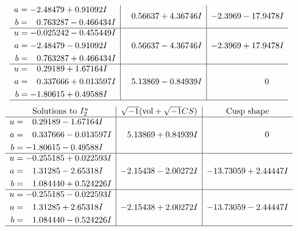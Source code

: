 \documentclass[1p]{elsarticle_modified}
\theoremstyle{definition}
\newcommand{\I}{\sqrt{-1}}
\begin{document}
$$\begin{array}{c|c|c}
\begin{aligned}
a &= -2.48479 + 0.91092 I \\
b &= \phantom{-}0.763287 - 0.466434 I\end{aligned}
 & \phantom{-}0.56637 + 4.36746 I & -2.3969 - 17.9478 I \\ \hline\begin{aligned}
u &= -0.025242 - 0.455449 I \\
a &= -2.48479 - 0.91092 I \\
b &= \phantom{-}0.763287 + 0.466434 I\end{aligned}
 & \phantom{-}0.56637 - 4.36746 I & -2.3969 + 17.9478 I \\ \hline\begin{aligned}
u &= \phantom{-}0.29189 + 1.67164 I \\
a &= \phantom{-}0.337666 + 0.013597 I \\
b &= -1.80615 + 0.49588 I\end{aligned}
 & \phantom{-}5.13869 - 0.84939 I & \phantom{-0.000000 } 0\\
 \hline 
 \end{array}$$\newpage$$\begin{array}{c|c|c}  
\text{Solutions to }I^u_{2}& \I (\text{vol} + \sqrt{-1}CS) & \text{Cusp shape}\\
 \hline 
\begin{aligned}
u &= \phantom{-}0.29189 - 1.67164 I \\
a &= \phantom{-}0.337666 - 0.013597 I \\
b &= -1.80615 - 0.49588 I\end{aligned}
 & \phantom{-}5.13869 + 0.84939 I & \phantom{-0.000000 } 0 \\ \hline\begin{aligned}
u &= -0.255185 + 0.022593 I \\
a &= \phantom{-}1.31285 - 2.65318 I \\
b &= \phantom{-}1.084440 + 0.524226 I\end{aligned}
 & -2.15438 - 2.00272 I & -13.73059 + 2.44447 I \\ \hline\begin{aligned}
u &= -0.255185 - 0.022593 I \\
a &= \phantom{-}1.31285 + 2.65318 I \\
b &= \phantom{-}1.084440 - 0.524226 I\end{aligned}
 & -2.15438 + 2.00272 I & -13.73059 - 2.44447 I\\
 \hline 
 \end{array}$$\newpage
\newpage\renewcommand{\arraystretch}{1}
\end{document}
